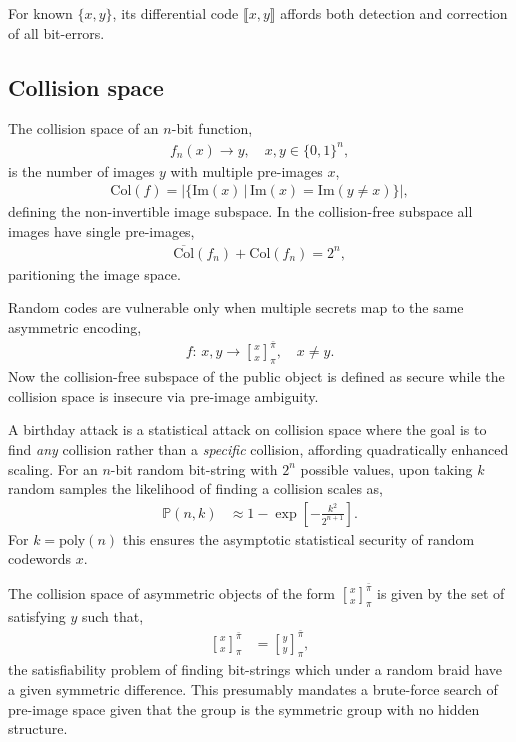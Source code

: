 \documentclass[twocolumn, aps, amsmath, amssymb, nofootinbib, superscriptaddress, longbibliography, doublefloatfix, table-of-contents, eqsecnum, rmp]{revtex4-2}
\def\diff#1#2{\llbracket #1,#2\rrbracket}
\newcommand{\stackbraid}[2]{{\genfrac{[}{]}{0pt}{}{{#1}}{{#2}}}^{\bar{\pi}}_{\pi}}
\begin{document}
For known $\{x,y\}$, its differential code $\diff{x}{y}$ affords both detection and correction of all bit-errors.

\subsection{Collision space}

The collision space of an $n$-bit function,
\begin{align}
	f_n(x) \to y,\quad x,y\in\{0,1\}^n,
\end{align}
is the number of images $y$ with multiple pre-images $x$,
\begin{align}
	\mathrm{Col}(f) = |\{\mathrm{Im}(x)\,|\,\mathrm{Im}(x)=\mathrm{Im}(y\neq x)\}|,
\end{align}
defining the non-invertible image subspace. In the collision-free subspace all images have single pre-images,
\begin{align}
	\overline{\mathrm{Col}}(f_n) + \mathrm{Col}(f_n) = 2^n,
\end{align}
paritioning the image space.

Random codes are vulnerable only when multiple secrets map to the same asymmetric encoding,
\begin{align}
	f:\, x,y \to \stackbraid{x}{x},\quad x\neq y.
\end{align}
Now the collision-free subspace of the public object is defined as secure while the collision space is insecure via pre-image ambiguity.

A birthday attack is a statistical attack on collision space where the goal is to find \emph{any} collision rather than a \emph{specific} collision, affording quadratically enhanced scaling. For an $n$-bit random bit-string with $2^n$ possible values, upon taking $k$ random samples the likelihood of finding a collision scales as,
\begin{align}
	\mathbb{P}(n,k) &\approx 1 - \exp\left[-\frac{k^2}{2^{n+1}}\right].
\end{align}
For $k=\mathrm{poly}(n)$ this ensures the asymptotic statistical security of random codewords $x$.

The collision space of asymmetric objects of the form $\stackbraid{x}{x}$ is given by the set of satisfying $y$ such that,
\begin{align}
	\stackbraid{x}{x} &= \stackbraid{y}{y},
\end{align}
the satisfiability problem of finding bit-strings which under a random braid have a given symmetric difference. This presumably mandates a brute-force search of pre-image space given that the group is the symmetric group with no hidden structure.
\end{document}
